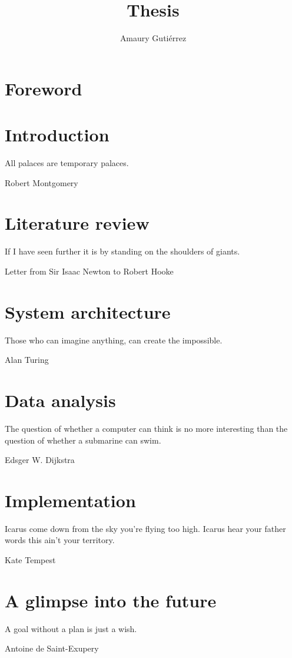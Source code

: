 \documentclass[12pt,letterpaper]{book}
\author{Amaury Guti\'errez}
\title{Thesis}
\theoremstyle{definition} \newtheorem{definition}{Definición}[section]
\theoremstyle{plain} \newtheorem{theorem}{Teorema}[section]
\theoremstyle{plain} \newtheorem{lemma}{Lema}[section]
\theoremstyle{plain} \newtheorem{proposition}[theorem]{Proposici\'on}
\theoremstyle{plain} \newtheorem{corollary}[theorem]{Corolario}
\theoremstyle{plain} \newtheorem{remark}[theorem]{Comentario}
\begin{document}
\frontmatter
 

\frontmatter
\tableofcontents
\chapter{Foreword}


\mainmatter

\chapter{Introduction}
\epigraph{All palaces are temporary palaces.}{Robert Montgomery}


\chapter{Literature review}
\epigraph{If I have seen further it is by standing on the shoulders of giants.}{Letter from Sir Isaac Newton to Robert Hooke}


\chapter{System architecture}
\epigraph{Those who can imagine anything, can create the impossible.}{Alan Turing}


\chapter{Data analysis}
\epigraph{The question of whether a computer can think is no more interesting than the question of whether a submarine can swim.}{Edsger W. Dijkstra}


\chapter{Implementation}
\epigraph{Icarus come down from the sky you're flying too high. Icarus hear your father words this ain't your territory.}{Kate Tempest}


\chapter{A glimpse into the future}
\epigraph{A goal without a plan is just a wish.}{Antoine de Saint-Exupery}


\iffalse

\backmatter
\appendix
\chapter{Appendix A}

\chapter{Appendix B}

\chapter{Appendix C}


\fi

\cleardoublepage
{}


\cleardoublepage
\printindex
\end{document}
